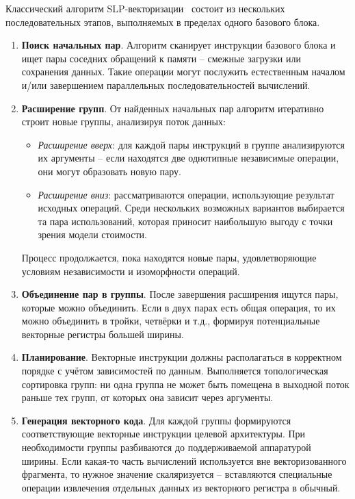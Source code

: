 Классический алгоритм SLP-векторизации~\cite{Larsen2000} состоит из нескольких последовательных этапов,
выполняемых в пределах одного базового блока.

\begin{enumerate}
    \item \textbf{Поиск начальных пар}. Алгоритм сканирует инструкции базового блока и ищет пары соседних обращений к памяти – смежные загрузки или сохранения данных. Такие операции могут послужить естественным началом и/или завершением параллельных последовательностей вычислений.
    
    \item \textbf{Расширение групп}. От найденных начальных пар алгоритм итеративно строит новые группы, анализируя поток данных:
    \begin{itemize}
        \item \textit{Расширение вверх}: для каждой пары инструкций в группе анализируются их аргументы – если находятся две однотипные независимые операции, они могут образовать новую пару.
        \item \textit{Расширение вниз}: рассматриваются операции, использующие результат исходных операций. Среди нескольких возможных вариантов выбирается та пара использований, которая приносит наибольшую выгоду с точки зрения модели стоимости.
    \end{itemize}
    Процесс продолжается, пока находятся новые пары, удовлетворяющие условиям независимости и изоморфности операций.
    
    \item \textbf{Объединение пар в группы}. После завершения расширения ищутся пары, которые можно объединить. Если в двух парах есть общая операция, то их можно объединить в тройки, четвёрки и т.д., формируя потенциальные векторные регистры большей ширины.
    
    \item \textbf{Планирование}. Векторные инструкции должны располагаться в корректном порядке с учётом зависимостей по данным. Выполняется топологическая сортировка групп: ни одна группа не может быть помещена в выходной поток раньше тех групп, от которых она зависит через аргументы.
    
    \item \textbf{Генерация векторного кода}. Для каждой группы формируются соответствующие векторные инструкции целевой архитектуры. 
    При необходимости группы разбиваются до поддерживаемой аппаратурой ширины. 
    Если какая-то часть вычислений используется вне векторизованного фрагмента, 
    то нужное значение скаляризуется – вставляются специальные операции извлечения отдельных данных из векторного регистра в обычный.
\end{enumerate}

